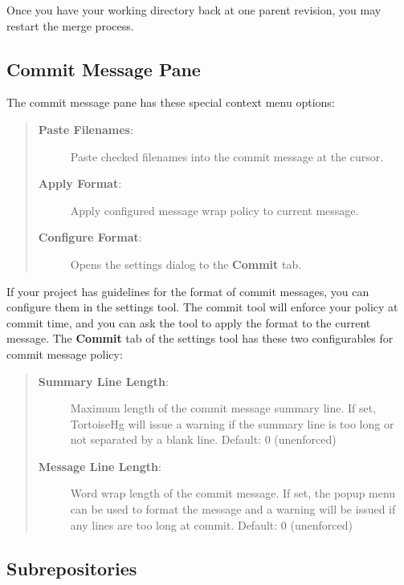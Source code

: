 \documentclass[letterpaper,10pt,english]{manual}
\begin{document}
Once you have your working directory back at one parent revision, you
may restart the merge process.


\subsection{Commit Message Pane}

The commit message pane has these special context menu options:
\begin{quote}
\begin{description}
\item[\textbf{Paste Filenames}:]
Paste checked filenames into the commit message at the cursor.

\item[\textbf{Apply Format}:]
Apply configured message wrap policy to current message.

\item[\textbf{Configure Format}:]
Opens the settings dialog to the \textbf{Commit} tab.

\end{description}
\end{quote}

If your project has guidelines for the format of commit messages, you
can configure them in the settings tool.  The commit tool will enforce
your policy at commit time, and you can ask the tool to apply the format
to the current message.  The \textbf{Commit} tab of the settings tool
has these two configurables for commit message policy:
\begin{quote}
\begin{description}
\item[\textbf{Summary Line Length}:]
Maximum length of the commit message summary line.  If set,
TortoiseHg will issue a warning if the summary line is too long
or not separated by a blank line. Default: 0 (unenforced)

\item[\textbf{Message Line Length}:]
Word wrap length of the commit message.  If set, the popup menu
can be used to format the message and a warning will be issued
if any lines are too long at commit.  Default: 0 (unenforced)

\end{description}
\end{quote}


\subsection{Subrepositories}
\end{document}
